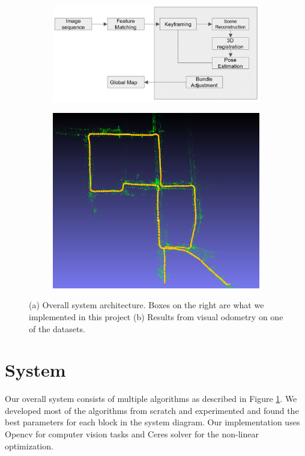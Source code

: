 \documentclass{article}
\begin{document}
\begin{figure}
    \centering
    \begin{subfigure}[b]{.55\linewidth}
        \includegraphics[width=\linewidth]{./system.png}
        \caption{}
        \label{fig:system}
    \end{subfigure}
    \begin{subfigure}[b]{.30\linewidth}
        \includegraphics[width=\linewidth]{./vo_stereo_5.png}
        \caption{}
        \label{fig:firstresult}
    \end{subfigure}
    \caption{(a) Overall system architecture. Boxes on the right are what we implemented in this project (b) Results from visual odometry on one of the datasets.}
\end{figure}

\section{System}
Our overall system consists of multiple algorithms as described in Figure \ref{fig:system}. We developed most of the algorithms from scratch and experimented and found the best parameters for each block in the system diagram. Our implementation uses Opencv\cite{opencv} for computer vision tasks and Ceres solver\cite{ceres-solver} for the non-linear optimization.
\end{document}
